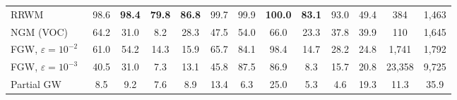 \begin{table}[!t]
\begin{tabular*}{\textwidth}{@{\extracolsep{\fill}}lcccccccccccc@{}}
RRWM~\cite{cho2010rrwm} & 98.6 & \textbf{98.4} & \textbf{79.8} & \textbf{86.8} & 99.7 & 99.9 & \textbf{100.0} & \textbf{83.1} & 93.0 & 49.4 & 384 & 1{,}463 \\
NGM (VOC)~\cite{wang2021ngm} & 64.2 & 31.0 & 8.2 & 28.3 & 47.5 & 54.0 & 66.0 & 23.3 & 37.8 & 39.9 & 110 & 1{,}645 \\
FGW, $\varepsilon{=}10^{-2}$~\cite{titouan2019optimal} & 61.0 & 54.2 & 14.3 & 15.9 & 65.7 & 84.1 & 98.4 & 14.7 & 28.2 & 24.8 & 1{,}741 & 1{,}792 \\
FGW, $\varepsilon{=}10^{-3}$~\cite{titouan2019optimal} & 40.5 & 31.0 & 7.3 & 13.1 & 45.8 & 87.5 & 86.9 & 8.3 & 15.7 & 20.8 & 23{,}358 & 9{,}725 \\
Partial GW~\cite{chapel2020partial} & 8.5 & 9.2 & 7.6 & 8.9 & 13.4 & 6.3 & 25.0 & 5.3 & 4.6 & 19.3 & 11.3 & 35.9 \\
\bottomrule
\end{tabular*}
\end{table}
